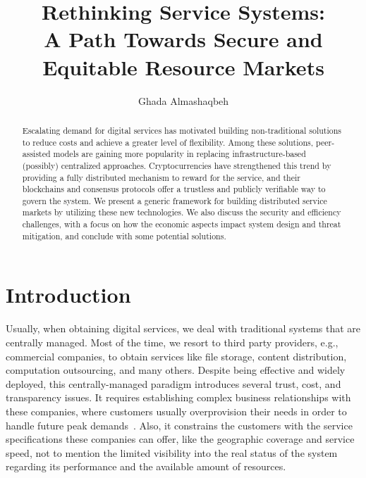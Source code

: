 \documentclass{llncs}
\begin{document}
%
\title{\Large \bf Rethinking Service Systems: \\
A Path Towards Secure and Equitable Resource Markets
}


\author{Ghada Almashaqbeh} 
%
%

\maketitle


\begin{abstract}
Escalating demand for digital services has motivated building non-traditional solutions to reduce costs and achieve a greater level of flexibility. Among these solutions, peer-assisted models are gaining more popularity in replacing infrastructure-based (possibly) centralized approaches. Cryptocurrencies have strengthened this trend by providing a fully distributed mechanism to reward for the service, and their blockchains and consensus protocols offer a trustless and publicly verifiable way to govern the system. We present a generic framework for building distributed service markets by utilizing these new technologies. We also discuss the security and efficiency challenges, with a focus on how the economic aspects impact system design and threat mitigation, and conclude with some potential solutions.
\end{abstract}


\section{Introduction}
Usually, when obtaining digital services, we deal with traditional systems that are centrally managed. Most of the time, we resort to third party providers, e.g., commercial companies,  to obtain services like file storage, content distribution, computation outsourcing, and many others. Despite being effective and widely deployed, this centrally-managed paradigm introduces several trust, cost, and transparency issues. It requires establishing complex business relationships with these companies, where customers usually overprovision their needs in order to handle future peak demands~\cite{Kassa13,Nicolae14}. Also, it constrains the customers with the service specifications these companies can offer, like the geographic coverage and service speed, not to mention the limited visibility into the real status of the system regarding its performance and the available amount of resources.
\end{document}
